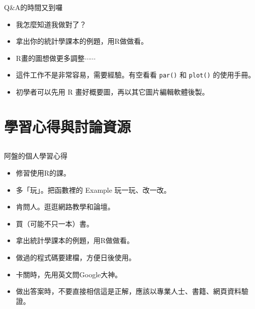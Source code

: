 \documentclass[12pt, aspectratio=43]{beamer}
\begin{document}


\begin{frame}[fragile]{Q\&A的時間又到囉}
\begin{itemize}
\item[Q] 我怎麼知道我做對了？
\item[A] 拿出你的統計學課本的例題，用R做做看。
\end{itemize}
\begin{itemize}\item[Q] R畫的圖想做更多調整$\cdots\cdots$
\item[A1] 這件工作不是非常容易，需要經驗。有空看看 \verb+par()+ 和 \verb+plot()+ 的使用手冊。
\item[A2] 初學者可以先用 R 畫好概要圖，再以其它圖片編輯軟體後製。
\end{itemize}
\end{frame}



\section{學習心得與討論資源}\subsection{}

\begin{frame}{阿盤的個人學習心得}
\begin{itemize}
\item 修習使用R的課。
\item 多「玩」。把函數裡的 Example 玩一玩、改一改。
\item 肯問人。逛逛網路教學和論壇。
\item 買（可能不只一本）書。
\item 拿出統計學課本的例題，用R做做看。
\item 做過的程式碼要建檔，方便日後使用。
\item 卡關時，先用英文問Google大神。
\item 做出答案時，不要直接相信這是正解，應該以專業人士、書籍、網頁資料驗證。
\end{itemize}
\end{frame}
\end{document}
